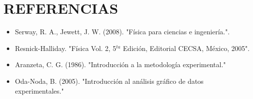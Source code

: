 \documentclass[journal]{IEEEtran}
\begin{document}
\section{ REFERENCIAS}
\begin{itemize}
\item Serway, R. A., Jewett, J. W. (2008). "Física para ciencias e ingeniería.".
\item Resnick-Halliday. "Física Vol. 2, 5$^{ta}$ Edición, Editorial CECSA, México, 2005".
\item Aranzeta, C. G. (1986). "Introducción a la metodología experimental."
\item Oda-Noda, B. (2005). "Introducción al análisis gráfico de datos experimentales." 
\end{itemize}
\end{document}
